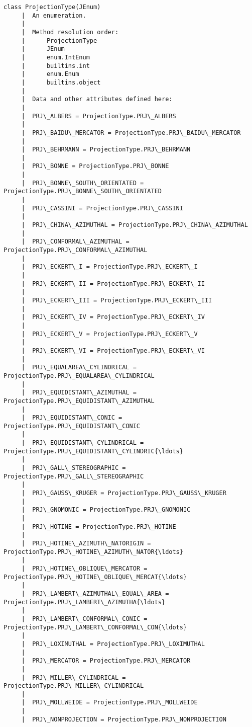 \documentclass[11pt]{article}
\begin{document}
\begin{Verbatim}[commandchars=\\\{\}]
    class ProjectionType(JEnum)
     |  An enumeration.
     |  
     |  Method resolution order:
     |      ProjectionType
     |      JEnum
     |      enum.IntEnum
     |      builtins.int
     |      enum.Enum
     |      builtins.object
     |  
     |  Data and other attributes defined here:
     |  
     |  PRJ\_ALBERS = ProjectionType.PRJ\_ALBERS
     |  
     |  PRJ\_BAIDU\_MERCATOR = ProjectionType.PRJ\_BAIDU\_MERCATOR
     |  
     |  PRJ\_BEHRMANN = ProjectionType.PRJ\_BEHRMANN
     |  
     |  PRJ\_BONNE = ProjectionType.PRJ\_BONNE
     |  
     |  PRJ\_BONNE\_SOUTH\_ORIENTATED = ProjectionType.PRJ\_BONNE\_SOUTH\_ORIENTATED
     |  
     |  PRJ\_CASSINI = ProjectionType.PRJ\_CASSINI
     |  
     |  PRJ\_CHINA\_AZIMUTHAL = ProjectionType.PRJ\_CHINA\_AZIMUTHAL
     |  
     |  PRJ\_CONFORMAL\_AZIMUTHAL = ProjectionType.PRJ\_CONFORMAL\_AZIMUTHAL
     |  
     |  PRJ\_ECKERT\_I = ProjectionType.PRJ\_ECKERT\_I
     |  
     |  PRJ\_ECKERT\_II = ProjectionType.PRJ\_ECKERT\_II
     |  
     |  PRJ\_ECKERT\_III = ProjectionType.PRJ\_ECKERT\_III
     |  
     |  PRJ\_ECKERT\_IV = ProjectionType.PRJ\_ECKERT\_IV
     |  
     |  PRJ\_ECKERT\_V = ProjectionType.PRJ\_ECKERT\_V
     |  
     |  PRJ\_ECKERT\_VI = ProjectionType.PRJ\_ECKERT\_VI
     |  
     |  PRJ\_EQUALAREA\_CYLINDRICAL = ProjectionType.PRJ\_EQUALAREA\_CYLINDRICAL
     |  
     |  PRJ\_EQUIDISTANT\_AZIMUTHAL = ProjectionType.PRJ\_EQUIDISTANT\_AZIMUTHAL
     |  
     |  PRJ\_EQUIDISTANT\_CONIC = ProjectionType.PRJ\_EQUIDISTANT\_CONIC
     |  
     |  PRJ\_EQUIDISTANT\_CYLINDRICAL = ProjectionType.PRJ\_EQUIDISTANT\_CYLINDRIC{\ldots}
     |  
     |  PRJ\_GALL\_STEREOGRAPHIC = ProjectionType.PRJ\_GALL\_STEREOGRAPHIC
     |  
     |  PRJ\_GAUSS\_KRUGER = ProjectionType.PRJ\_GAUSS\_KRUGER
     |  
     |  PRJ\_GNOMONIC = ProjectionType.PRJ\_GNOMONIC
     |  
     |  PRJ\_HOTINE = ProjectionType.PRJ\_HOTINE
     |  
     |  PRJ\_HOTINE\_AZIMUTH\_NATORIGIN = ProjectionType.PRJ\_HOTINE\_AZIMUTH\_NATOR{\ldots}
     |  
     |  PRJ\_HOTINE\_OBLIQUE\_MERCATOR = ProjectionType.PRJ\_HOTINE\_OBLIQUE\_MERCAT{\ldots}
     |  
     |  PRJ\_LAMBERT\_AZIMUTHAL\_EQUAL\_AREA = ProjectionType.PRJ\_LAMBERT\_AZIMUTHA{\ldots}
     |  
     |  PRJ\_LAMBERT\_CONFORMAL\_CONIC = ProjectionType.PRJ\_LAMBERT\_CONFORMAL\_CON{\ldots}
     |  
     |  PRJ\_LOXIMUTHAL = ProjectionType.PRJ\_LOXIMUTHAL
     |  
     |  PRJ\_MERCATOR = ProjectionType.PRJ\_MERCATOR
     |  
     |  PRJ\_MILLER\_CYLINDRICAL = ProjectionType.PRJ\_MILLER\_CYLINDRICAL
     |  
     |  PRJ\_MOLLWEIDE = ProjectionType.PRJ\_MOLLWEIDE
     |  
     |  PRJ\_NONPROJECTION = ProjectionType.PRJ\_NONPROJECTION

\end{Verbatim}
\end{document}
